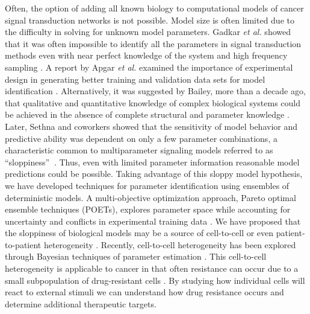 \documentclass[12pt]{article}
\begin{document}
Often, the option of adding all known biology to computational models of cancer signal transduction networks is not possible. Model size is often limited due to the difficulty in solving for unknown model parameters. Gadkar \textit{et al.} showed that it was often impossible to identify all the parameters in signal transduction methods even with near perfect knowledge of the system and high frequency sampling \cite{Gadkar2005}. A report by Apgar \textit{et al.} examined the importance of experimental design in generating better training and validation data sets for model identification \cite{Apgar2010}. Alternatively, it was suggested by Bailey, more than a decade ago, that qualitative and quantitative knowledge of complex biological systems could be achieved in the absence of complete structural and parameter knowledge \cite{Bailey2001}. Later, Sethna and coworkers showed that the sensitivity of model behavior and predictive ability was dependent on only a few parameter combinations, a characteristic common to multiparameter signaling models referred to as \textquotedblleft sloppiness\textquotedblright $\:$ \cite{Daniels2008}. Thus, even with limited parameter information reasonable model predictions could be possible. Taking advantage of this sloppy model hypothesis, we have developed techniques for parameter identification using ensembles of deterministic models. A multi-objective optimization approach, Pareto optimal ensemble techniques (POETs), explores parameter space while accounting for uncertainty and conflicts in experimental training data \cite{Song2010}. We have proposed that the sloppiness of biological models may be a source of cell-to-cell \cite{Lequieu2011} or even patient-to-patient heterogeneity \cite{Luan2010}. Recently, cell-to-cell heterogeneity has been explored through Bayesian techniques of parameter estimation \cite{Hasenauer2011,Kalita2011}. 
This cell-to-cell heterogeneity is applicable to cancer in that often resistance can occur due to a small subpopulation of drug-resistant cells \cite{Cohen2008}. 
By studying how individual cells will react to external stimuli we can understand how drug resistance occurs and determine additional therapeutic targets. 
\end{document}
